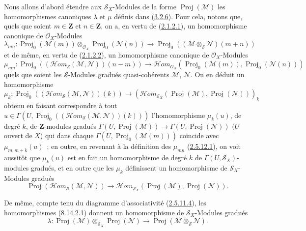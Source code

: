 \begin{env}[8.14.2]
\label{II.8.14.2-fr}
Nous allons d'abord étendre aux $\mathcal{S}_X$-Modules de la forme
$\operatorname{Proj}(\mathcal{M})$ les homomorphismes canoniques $\lambda$
et $\mu$ définis dans (\hyperref[II.3.2.6-fr]{3.2.6}). Pour cela, notons
que, quels que soient $m\in\mathbf{Z}$ et $n\in\mathbf{Z}$, on a, en vertu
de (\hyperref[II.2.1.2.1-fr]{2.1.2.1}), un homomorphisme canonique de
$\mathcal{O}_X$-Modules
\begin{equation}
\label{II.8.14.2.1-fr}
  \lambda_{mn}:\operatorname{Proj}_0(\mathcal{M}(m))
  \otimes_{\mathcal{O}_X}\operatorname{Proj}_0(\mathcal{N}(n))
  \to\operatorname{Proj}_0
  ((\mathcal{M}\otimes_{\mathcal{S}}\mathcal{N})(m+n))
\tag{8.14.2.1}
\end{equation}
et de même, en vertu de (\hyperref[II.2.1.2.2-fr]{2.1.2.2}), un
homomorphisme canonique de $\mathcal{O}_X$-Modules
\begin{equation}
\label{II.8.14.2.2-fr}
  \mu_{mn}:\operatorname{Proj}_0
  ((\mathcal{H}om_{\mathcal{S}}(\mathcal{M},\mathcal{N}))(n-m))
  \to\mathcal{H}om_{\mathcal{O}_X}
  (\operatorname{Proj}_0(\mathcal{M}(m)),
   \operatorname{Proj}_0(\mathcal{N}(n)))
\tag{8.14.2.2}
\end{equation}
quels que soient les $\mathcal{S}$-Modules gradués quasi-cohérents
$\mathcal{M}$, $\mathcal{N}$. On en déduit un homomorphisme
\[
  \mu_k:\operatorname{Proj}_0
  ((\mathcal{H}om_{\mathcal{S}}(\mathcal{M},\mathcal{N}))(k))
  \to
  (\mathcal{H}om_{\mathcal{S}_X}
  (\operatorname{Proj}(\mathcal{M}),\operatorname{Proj}(\mathcal{N})))_k
\]
obtenu en faisant correspondre à tout
$u\in\Gamma(U,\operatorname{Proj}_0
((\mathcal{H}om_{\mathcal{S}}(\mathcal{M},\mathcal{N}))(k)))$
l'homomorphisme $\mu_k(u)$, de degré $k$, de $\mathbf{Z}$-modules gradués
$\Gamma(U,\operatorname{Proj}(\mathcal{M}))\to
\Gamma(U,\operatorname{Proj}(\mathcal{N}))$ ($U$ ouvert de $X$) qui dans
chaque $\Gamma(U,\operatorname{Proj}_0(\mathcal{M}(m)))$ coïncide avec
$\mu_{m,m+k}(u)$~; en outre, en revenant à la définition des $\mu_{mn}$
(\hyperref[II.2.5.12.1-fr]{2.5.12.1}), on voit aussitôt que $\mu_k(u)$ est
en fait un homomorphisme de degré $k$ de
$\Gamma(U,\mathcal{S}_X)$-modules gradués, et en outre que les $\mu_k$
définissent un homomorphisme de $\mathcal{S}_X$-Modules gradués
\begin{equation}
\label{II.8.14.2.3-fr}
  \operatorname{Proj}
  (\mathcal{H}om_{\mathcal{S}}(\mathcal{M},\mathcal{N}))
  \to\mathcal{H}om_{\mathcal{S}_X}
  (\operatorname{Proj}(\mathcal{M}),\operatorname{Proj}(\mathcal{N})).
\tag{8.14.2.3}
\end{equation}

De même, compte tenu du diagramme d'associativité
(\hyperref[II.2.5.11.4-fr]{2.5.11.4}), les homomorphismes
(\hyperref[II.8.14.2.1-fr]{8.14.2.1}) donnent un homomorphisme de
$\mathcal{S}_X$-Modules gradués
\begin{equation}
\label{II.8.14.2.4-fr}
  \lambda:\operatorname{Proj}(\mathcal{M})
  \otimes_{\mathcal{S}_X}\operatorname{Proj}(\mathcal{N})
  \to\operatorname{Proj}(\mathcal{M}\otimes_{\mathcal{S}}\mathcal{N}).
\tag{8.14.2.4}
\end{equation}
\end{env}

